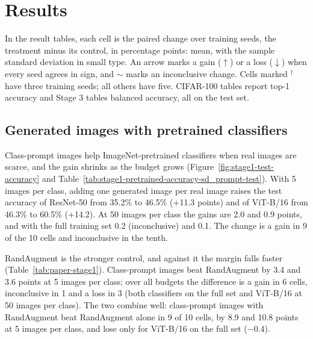 \section{Results}
\label{sec:results}


In the result tables, each cell is the paired change over training seeds, the treatment minus its control,
in percentage points: mean, with the sample standard deviation in small type. An arrow marks a gain
($\uparrow$) or a loss ($\downarrow$) when every seed agrees in sign, and $\sim$ marks an inconclusive change.
Cells marked $^\dagger$ have three training seeds; all others have five. CIFAR-100 tables report top-1
accuracy and Stage 3 tables balanced accuracy, all on the test set.

\subsection{Generated images with pretrained classifiers}
\label{sec:results-pretrained}
Class-prompt images help ImageNet-pretrained classifiers when real images are scarce, and the gain
shrinks as the budget grows (Figure~\ref{fig:stage1-test-accuracy} and
Table~\ref{tab:stage1-pretrained-accuracy-sd_prompt-test}). With 5 images per class, adding
one generated image per real image raises the test accuracy of ResNet-50 from 35.2\% to 46.5\% (+11.3
points) and of ViT-B/16 from 46.3\% to 60.5\% (+14.2). At 50 images per class the gains are 2.0 and 0.9
points, and with the full training set 0.2 (inconclusive) and 0.1. The change is a gain in 9 of the 10
cells and inconclusive in the tenth.

RandAugment is the stronger control, and against it the margin falls faster
(Table~\ref{tab:paper-stage1}). Class-prompt images beat RandAugment by 3.4 and 3.6 points at
5 images per class; over all budgets the difference is a gain in 6 cells, inconclusive in 1 and a loss in
3 (both classifiers on the full set and ViT-B/16 at 50 images per class). The two combine well: class-prompt
images with RandAugment beat RandAugment alone in 9 of 10 cells, by 8.9 and 10.8 points at 5 images per
class, and lose only for ViT-B/16 on the full set ($-0.4$).


